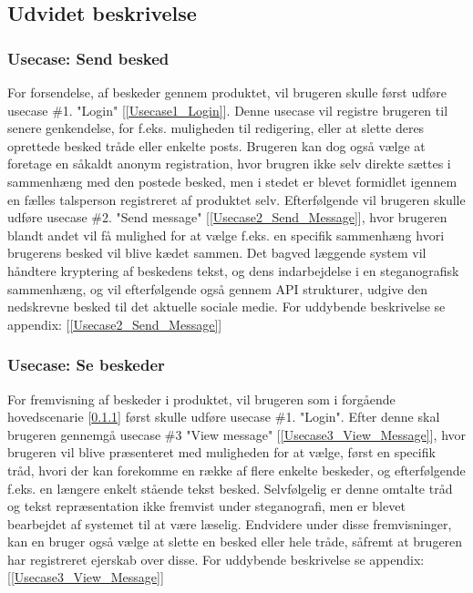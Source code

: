 \subsection{Udvidet beskrivelse}
\subsubsection{Usecase: Send besked}
\label{Hovedscenarie1}
For forsendelse, af beskeder gennem produktet, vil brugeren skulle først udføre usecase \#1. "Login" [\ref{Usecase1_Login}]. Denne usecase vil registre brugeren til senere genkendelse, for f.eks. muligheden til redigering, eller at slette deres oprettede besked tråde eller enkelte posts. Brugeren kan dog også vælge at foretage en såkaldt anonym registration, hvor brugren ikke selv direkte sættes i sammenhæng med den postede besked, men i stedet er blevet formidlet igennem en fælles talsperson registreret af produktet selv. Efterfølgende vil brugeren skulle udføre usecase \#2. "Send message" [\ref{Usecase2_Send_Message}], hvor brugeren blandt andet vil få mulighed for at vælge f.eks. en specifik sammenhæng hvori brugerens besked vil blive kædet sammen. Det bagved læggende system vil håndtere kryptering af beskedens tekst, og dens indarbejdelse i en steganografisk sammenhæng, og vil efterfølgende også gennem API strukturer, udgive den nedskrevne besked til det aktuelle sociale medie. For uddybende beskrivelse se appendix: [\ref{Usecase2_Send_Message}]
\subsubsection{Usecase: Se beskeder}
\label{Hovedscenarie2}
For fremvisning af beskeder i produktet, vil brugeren som i forgående hovedscenarie [\ref{Hovedscenarie1}] først skulle udføre usecase \#1. "Login". Efter denne skal brugeren gennemgå usecase \#3 "View message" [\ref{Usecase3_View_Message}], hvor brugeren vil blive præsenteret med muligheden for at vælge, først en specifik tråd, hvori der kan forekomme en række af flere enkelte beskeder, og efterfølgende f.eks. en længere enkelt stående tekst besked.
Selvfølgelig er denne omtalte tråd og tekst repræsentation ikke fremvist under steganografi, men er blevet bearbejdet af systemet til at være læselig.
Endvidere under disse fremvisninger, kan en bruger også vælge at slette en besked eller hele tråde, såfremt at brugeren har registreret ejerskab over disse. For uddybende beskrivelse se appendix: [\ref{Usecase3_View_Message}]

